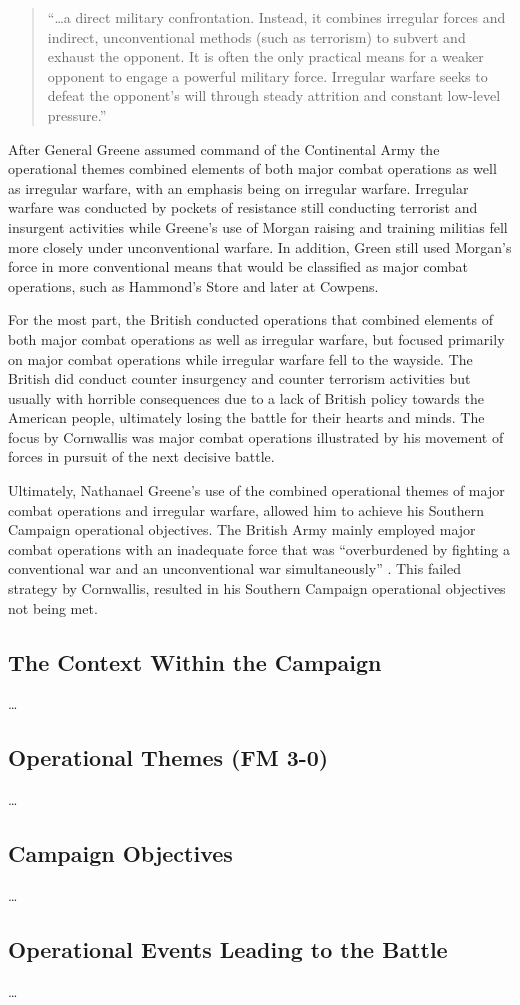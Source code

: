 \begin{quote} “…a direct military confrontation. Instead, it combines irregular
  forces and indirect, unconventional methods (such as terrorism) to subvert and
  exhaust the opponent. It is often the only practical means for a weaker
  opponent to engage a powerful military force. Irregular warfare seeks to
  defeat the opponent’s will through steady attrition and constant low-level
  pressure.” \end{quote}

After General Greene assumed command of the Continental Army the operational
themes combined elements of both major combat operations as well as irregular
warfare, with an emphasis being on irregular warfare.  Irregular warfare was
conducted by pockets of resistance still conducting terrorist and insurgent
activities while Greene’s use of Morgan raising and training militias fell more
closely under unconventional warfare.  In addition, Green still used Morgan’s
force in more conventional means that would be classified as major combat
operations, such as Hammond’s Store and later at Cowpens.

For the most part, the British conducted operations that combined elements of
both major combat operations as well as irregular warfare, but focused primarily
on major combat operations while irregular warfare fell to the wayside.  The
British did conduct counter insurgency and counter terrorism activities but
usually with horrible consequences due to a lack of British policy towards the
American people, ultimately losing the battle for their hearts and minds.  The
focus by Cornwallis was major combat operations illustrated by his movement of
forces in pursuit of the next decisive battle.  

Ultimately, Nathanael Greene’s use of the combined operational themes of major
combat operations and irregular warfare, allowed him to achieve his Southern
Campaign operational objectives.  The British Army mainly employed major combat
operations with an inadequate force that was “overburdened by fighting a
conventional war and an unconventional war simultaneously”
\cite[55]{woodward_comparative_2002}.  This failed strategy by Cornwallis,
resulted in his Southern Campaign operational objectives not being met.

\subsection{The Context Within the Campaign}


\ldots

\subsection{Operational Themes (FM 3-0)}

\ldots

\subsection{Campaign Objectives}

\ldots

\subsection{Operational Events Leading to the Battle}

\ldots




